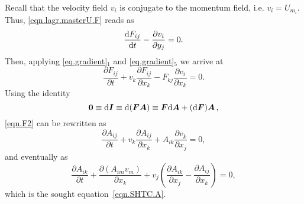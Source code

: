 \documentclass[twoside]{article}
\newcommand{\AAA}{{\boldsymbol{A}}}
\newcommand{\FF}{{\boldsymbol{F}}}
\newcommand{\II}{{\boldsymbol{I}}}
\newcommand{\pd}{\partial}
\newcommand{\rmd}{{\rm d}}
\newcommand{\IP}[1]{ \textcolor{blue}   {\small\texttt{
\texttt{[image: pin\_small.jpeg]} Ilya: #1}} }
\newcommand{\MP}[1]{ \textcolor{Green}   {\small\texttt{
\texttt{[image: pin\_small.jpeg]} Michal: #1}} }
\begin{document}
Recall that the velocity field $ v_i $ is conjugate to the momentum field, 
i.e. $ v_i=U_{m_i} $. Thus, \eqref{eqn.lagr.masterU.F} reads as
\begin{equation}
\frac{\rmd F_{ij}}{\rmd t} - \frac{\pd v_i}{\pd y_j}=0.
\end{equation}
Then, applying \eqref{eq.gradient}$ _1 $ and \eqref{eq.gradient}$ _5 $ we 
arrive 
at
\begin{equation}\label{eqn.F2}
\frac{\pd F_{ij}}{\pd t} + v_k\frac{\pd F_{ij}}{\pd x_k}-F_{kj}\frac{\pd 
v_i}{\pd x_k}=0.
\end{equation}
Using the identity
\begin{equation}\label{eqn.F3}
\bm{0}\equiv{\rm d}\II\equiv{\rm d}(\FF\AAA)\equiv\FF{\rm d}\AAA + ({\rm 
d}\FF)\AAA\,,
\end{equation}
\eqref{eqn.F2} can be rewritten as
\begin{equation}\label{eqn.F4}
\dfrac{\pd A_{ij}}{\pd t} + v_k\dfrac{\pd A_{ij}}{\pd x_k} +A_{ik}\dfrac{\pd 
v_k}{\pd x_j}=0,
\end{equation}
and eventually as
\begin{equation}\label{eqn.F5}
\frac{\pd A_{i k}}{\pd t}+\frac{\pd (A_{im} v_m)}{\pd 
x_k}+v_j\left(\frac{\pd A_{ik}}{\pd x_j}-\frac{\pd 
A_{ij}}{\pd x_k}\right) = 0,
\end{equation}
which is the sought equation~\eqref{eqn.SHTC.A}.
\end{document}
